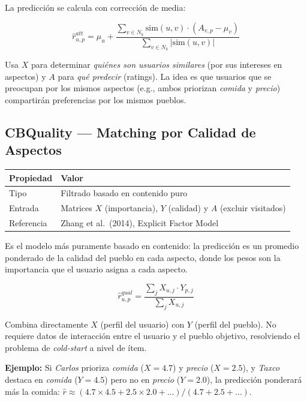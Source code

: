 \documentclass[11pt, a4paper]{article}
\begin{document}
La predicción se calcula con corrección de media:

\begin{equation}
    \hat{r}_{u,p}^{att} = \mu_u + \frac{\sum_{v \in N_k} \text{sim}(u,v) \cdot (A_{v,p} - \mu_v)}{\sum_{v \in N_k} |\text{sim}(u,v)|}
\end{equation}

Usa $X$ para determinar \textit{quiénes son usuarios similares} (por sus intereses en aspectos) y $A$ para \textit{qué predecir} (ratings). La idea es que usuarios que se preocupan por los mismos aspectos (e.g., ambos priorizan \textit{comida} y \textit{precio}) compartirán preferencias por los mismos pueblos.

\subsection{CBQuality --- Matching por Calidad de Aspectos}

\begin{table}[H]\centering
\begin{tabular}{ll}
\toprule
\textbf{Propiedad} & \textbf{Valor} \\
\midrule
Tipo      & Filtrado basado en contenido puro \\
Entrada   & Matrices $X$ (importancia), $Y$ (calidad) y $A$ (excluir visitados) \\
Referencia & Zhang et al.\ (2014), Explicit Factor Model \\
\bottomrule
\end{tabular}
\end{table}

Es el modelo más puramente basado en contenido: la predicción es un promedio ponderado de la calidad del pueblo en cada aspecto, donde los pesos son la importancia que el usuario asigna a cada aspecto.

\begin{equation}
    \hat{r}_{u,p}^{qual} = \frac{\sum_j X_{u,j} \cdot Y_{p,j}}{\sum_j X_{u,j}}
\end{equation}

Combina directamente $X$ (perfil del usuario) con $Y$ (perfil del pueblo). No requiere datos de interacción entre el usuario y el pueblo objetivo, resolviendo el problema de \textit{cold-start} a nivel de ítem.

\textbf{Ejemplo:} Si \textit{Carlos} prioriza \textit{comida} ($X = 4.7$) y \textit{precio} ($X = 2.5$), y \textit{Taxco} destaca en \textit{comida} ($Y = 4.5$) pero no en \textit{precio} ($Y = 2.0$), la predicción ponderará más la comida:
$\hat{r} \approx (4.7 \times 4.5 + 2.5 \times 2.0 + \ldots) / (4.7 + 2.5 + \ldots)$.
\end{document}
